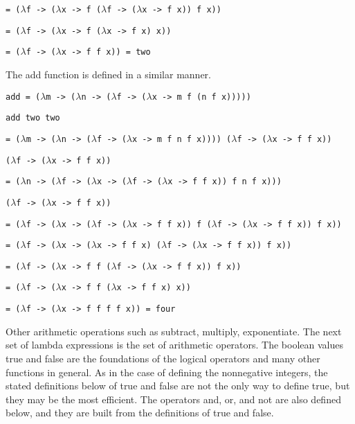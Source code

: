 \documentclass[11pt]{article}
\begin{document}
\hspace{2.5cm}\texttt{= ($\lambda$f -> ($\lambda$x -> f ($\lambda$f -> ($\lambda$x -> f x)) f x))}

\hspace{2.5cm}\texttt{= ($\lambda$f -> ($\lambda$x -> f ($\lambda$x -> f x) x))}

\hspace{2.5cm}\texttt{= ($\lambda$f -> ($\lambda$x -> f f x)) = two}

The add function is defined in a similar manner.

\hspace{2cm}\texttt{add = ($\lambda$m -> ($\lambda$n -> ($\lambda$f -> ($\lambda$x -> m f (n f x)))))}


\hspace{2cm}\texttt{add two two}

\hspace{2.5cm}\texttt{= ($\lambda$m -> ($\lambda$n -> ($\lambda$f -> ($\lambda$x -> m f n f x)))) ($\lambda$f -> ($\lambda$x -> f f x))}

\hspace{4cm}\texttt{($\lambda$f -> ($\lambda$x -> f f x))}

\hspace{2.5cm}\texttt{= ($\lambda$n -> ($\lambda$f -> ($\lambda$x -> ($\lambda$f -> ($\lambda$x -> f f x)) f n f x)))}

\hspace{4cm}\texttt{($\lambda$f -> ($\lambda$x -> f f x))}

\hspace{2.5cm}\texttt{= ($\lambda$f -> ($\lambda$x -> ($\lambda$f -> ($\lambda$x -> f f x)) f ($\lambda$f -> ($\lambda$x -> f f x)) f x))}

\hspace{2.5cm}\texttt{= ($\lambda$f -> ($\lambda$x -> ($\lambda$x -> f f x) ($\lambda$f -> ($\lambda$x -> f f x)) f x))}

\hspace{2.5cm}\texttt{= ($\lambda$f -> ($\lambda$x -> f f ($\lambda$f -> ($\lambda$x -> f f x)) f x))}

\hspace{2.5cm}\texttt{= ($\lambda$f -> ($\lambda$x -> f f ($\lambda$x -> f f x) x))}

\hspace{2.5cm}\texttt{= ($\lambda$f -> ($\lambda$x -> f f f f x)) = four}

Other arithmetic operations such as subtract, multiply, exponentiate. The next set of lambda expressions is the set of arithmetic operators. The boolean values true and false are the foundations of the logical operators and many other functions in general. As in the case of defining the nonnegative integers, the stated definitions below of true and false are not the only way to define true, but they may be the most efficient. The operators and, or, and not are also defined below, and they are built from the definitions of true and false.
\end{document}
